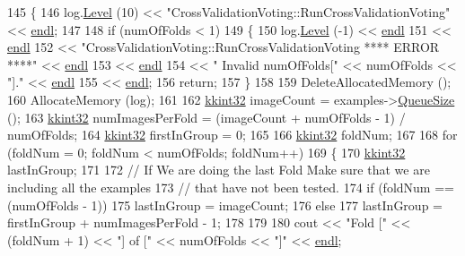 \begin{DoxyCode}
145 \{
146   log.\hyperlink{class_k_k_b_1_1_run_log_a32cf761d7f2e747465fd80533fdbb659}{Level} (10) << \textcolor{stringliteral}{"CrossValidationVoting::RunCrossValidationVoting"} << 
      \hyperlink{namespace_k_k_b_ad1f50f65af6adc8fa9e6f62d007818a8}{endl};
147 
148   \textcolor{keywordflow}{if}  (numOfFolds < 1)
149   \{
150     log.\hyperlink{class_k_k_b_1_1_run_log_a32cf761d7f2e747465fd80533fdbb659}{Level} (-1) << \hyperlink{namespace_k_k_b_ad1f50f65af6adc8fa9e6f62d007818a8}{endl}
151                    << \hyperlink{namespace_k_k_b_ad1f50f65af6adc8fa9e6f62d007818a8}{endl}
152                    << \textcolor{stringliteral}{"CrossValidationVoting::RunCrossValidationVoting     **** ERROR ****"} << 
      \hyperlink{namespace_k_k_b_ad1f50f65af6adc8fa9e6f62d007818a8}{endl}
153                    << \hyperlink{namespace_k_k_b_ad1f50f65af6adc8fa9e6f62d007818a8}{endl}
154                    << \textcolor{stringliteral}{"                                  Invalid  numOfFolds["} << numOfFolds << \textcolor{stringliteral}{"]."} << 
      \hyperlink{namespace_k_k_b_ad1f50f65af6adc8fa9e6f62d007818a8}{endl}
155                    << \hyperlink{namespace_k_k_b_ad1f50f65af6adc8fa9e6f62d007818a8}{endl};
156     \textcolor{keywordflow}{return};
157   \}
158 
159   DeleteAllocatedMemory ();
160   AllocateMemory (log);
161 
162   \hyperlink{namespace_k_k_b_a8fa4952cc84fda1de4bec1fbdd8d5b1b}{kkint32}  imageCount       = examples->\hyperlink{class_k_k_b_1_1_k_k_queue_a1dab601f75ee6a65d97f02bddf71c40d}{QueueSize} ();
163   \hyperlink{namespace_k_k_b_a8fa4952cc84fda1de4bec1fbdd8d5b1b}{kkint32}  numImagesPerFold = (imageCount + numOfFolds - 1) / numOfFolds;
164   \hyperlink{namespace_k_k_b_a8fa4952cc84fda1de4bec1fbdd8d5b1b}{kkint32}  firstInGroup     = 0;
165 
166   \hyperlink{namespace_k_k_b_a8fa4952cc84fda1de4bec1fbdd8d5b1b}{kkint32}  foldNum;
167 
168   \textcolor{keywordflow}{for}  (foldNum = 0;  foldNum < numOfFolds;  foldNum++)
169   \{
170     \hyperlink{namespace_k_k_b_a8fa4952cc84fda1de4bec1fbdd8d5b1b}{kkint32}  lastInGroup;
171 
172     \textcolor{comment}{// If We are doing the last Fold Make sure that we are including all the examples }
173     \textcolor{comment}{// that have not been tested.}
174     \textcolor{keywordflow}{if}  (foldNum == (numOfFolds - 1))
175       lastInGroup = imageCount;
176     \textcolor{keywordflow}{else}
177       lastInGroup = firstInGroup + numImagesPerFold - 1;
178 
179 
180     cout << \textcolor{stringliteral}{"Fold ["} << (foldNum + 1) << \textcolor{stringliteral}{"]  of  ["} << numOfFolds << \textcolor{stringliteral}{"]"} << \hyperlink{namespace_k_k_b_ad1f50f65af6adc8fa9e6f62d007818a8}{endl};

\end{DoxyCode}
